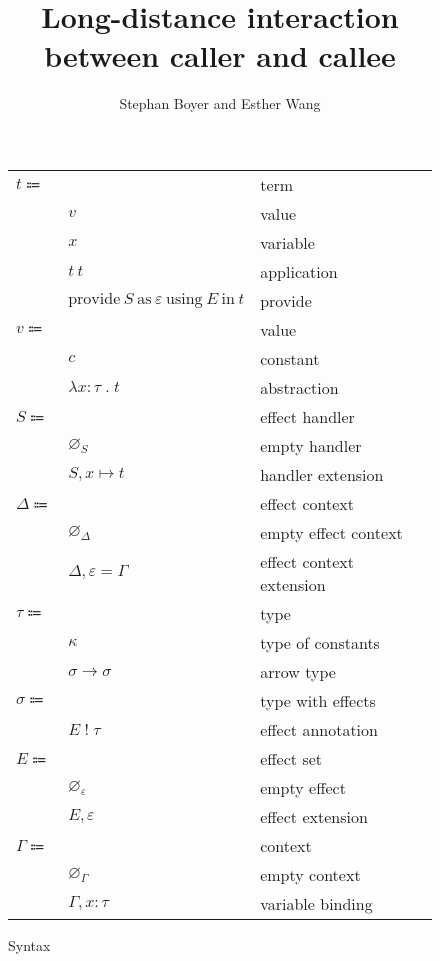 \documentclass[12pt]{article}
\title{Long-distance interaction \\ between caller and callee}
\author{Stephan Boyer and Esther Wang}
\date{}
\newcommand\eterm{t}
\newcommand\evalue{v}
\newcommand\econst{c}
\newcommand\evar{x}
\newcommand\eabs[2]{\lambda#1\;.\;#2}
\newcommand\eapp[2]{#1\ #2}
\newcommand\eprovide[4]{\text{provide}\ #1\ \text{as}\ #2\ \text{using}\ #3\ \text{in}\ #4}
\newcommand\pall{S}
\newcommand\pitem[2]{#1\mapsto#2}
\newcommand\pempty{\varnothing_{\pall}}
\newcommand\pextend[2]{#1, #2}
\newcommand\ttype{\tau}
\newcommand\tconst{\kappa}
\newcommand\tarrow[2]{#1\rightarrow#2}
\newcommand\tanno[2]{#1:#2}
\newcommand\tx{\sigma}
\newcommand\twithx[2]{#1\;!\;#2}
\newcommand\xeffect{\varepsilon}
\newcommand\xeffects{E}
\newcommand\xempty{\varnothing_{\xeffect}}
\newcommand\xextend[2]{#1, #2}
\newcommand\xc{\Delta}
\newcommand\xcempty{\varnothing_{\xc}}
\newcommand\xcextend[2]{#1, #2}
\newcommand\xcitem[2]{#1 = #2}
\newcommand\ccontext{\Gamma}
\newcommand\cempty{\varnothing_{\ccontext}}
\newcommand\cextend[2]{#1, #2}
\begin{document}
  \maketitle

  \begin{figure}
    \begin{mdframed}
      \begin{center}
        \begin{tabular}{l l l}
          $\eterm \Coloneqq $ & & term \\
          & $\evalue$ & value \\
          & $\evar$ & variable \\
          & $\eapp{\eterm}{\eterm}$ & application \\
          & $\eprovide{\pall}{\xeffect}{\xeffects}{\eterm}$ & provide \\
          $\evalue \Coloneqq $ & & value \\
          & $\econst$ & constant \\
          & $\eabs{\tanno{\evar}{\ttype}}{\eterm}$ & abstraction \\
          $\pall \Coloneqq$ & & effect handler \\
          & $\pempty$ & empty handler \\
          & $\pextend{\pall}{\pitem{\evar}{\eterm}}$ & handler extension \\
          $\xc \Coloneqq$ & & effect context \\
          & $\xcempty$ & empty effect context \\
          & $\xcextend{\xc}{\xcitem{\xeffect}{\ccontext}}$ & effect context extension \\
          $\ttype \Coloneqq$ & & type \\
          & $\tconst$ & type of constants \\
          & $\tarrow{\tx}{\tx}$ & arrow type \\
          $\tx \Coloneqq$ & & type with effects \\
          & $\twithx{\xeffects}{\ttype}$ & effect annotation \\
          $\xeffects \Coloneqq$ & & effect set \\
          & $\xempty$ & empty effect \\
          & $\xextend{\xeffects}{\xeffect}$ & effect extension \\
          $\ccontext \Coloneqq$ & & context \\
          & $\cempty$ & empty context \\
          & $\cextend{\ccontext}{\tanno{\evar}{\ttype}}$ & variable binding \\
        \end{tabular}
      \end{center}

      \caption{Syntax}\label{fig:syntax}
    \end{mdframed}
  \end{figure}
\end{document}
